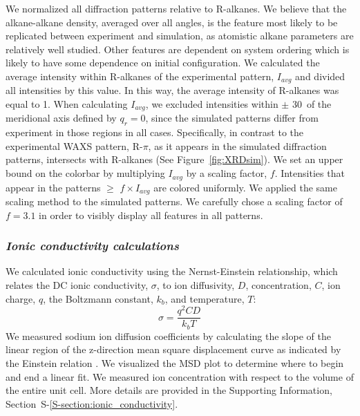 \documentclass[journal=jpcbfk,manuscript=article]{achemso}
\begin{document}
  We normalized all diffraction patterns relative to R-alkanes. We believe that the
  alkane-alkane density, averaged over all angles, is the feature most likely to be
  replicated between experiment and simulation, as atomistic alkane parameters are 
  relatively well studied. Other features are dependent on 
  system ordering which is likely to have some dependence on initial configuration. 
  We calculated the average intensity within R-alkanes of the experimental pattern,
  $I_{avg}$ and divided all intensities by this value. In this way, the average intensity
  of R-alkanes was equal to 1. When calculating $I_{avg}$, we excluded intensities 
  within $\pm$ 30\degree~of the meridional axis defined by $q_r=0$, since the simulated
  patterns differ from experiment in those regions in all cases. Specifically, in contrast
  to the experimental WAXS pattern, R-$\pi$, as it appears in the simulated diffraction 
  patterns, intersects with R-alkanes (See Figure~\ref{fig:XRDsim}). We set
  an upper bound on the colorbar by multiplying $I_{avg}$ by a scaling factor, $f$. 
  Intensities that appear in the patterns $\geq$ $f\times I_{avg}$ are colored uniformly. 
  We applied the same scaling method to the simulated patterns. We carefully chose a scaling
  factor of $f=3.1$ in order to visibly display all features in all patterns.

  \subsubsection{\textit{Ionic conductivity calculations}}

  We calculated ionic conductivity using the Nernst-Einstein relationship, which 
  relates the DC ionic conductivity, $\sigma$, to ion diffusivity, $D$, 
  concentration, $C$, ion charge, $q$, the Boltzmann constant, $k_b$, and 
  temperature, $T$: 
  \begin{equation}
	\sigma = \dfrac{q^2CD}{k_b T} 
	\label{eqn:nernst_einstein}
  \end{equation}
  We measured sodium ion diffusion coefficients by calculating the slope
  of the linear region of the z-direction mean square displacement curve as
  indicated by the Einstein relation \cite{einstein_investigations_1956}. We
  visualized the MSD plot to determine where to begin and end a linear fit. We
  measured ion concentration with respect to the volume of the entire unit cell. 
  More details are provided in the Supporting Information, Section~S-\ref{S-section:ionic_conductivity}.
\end{document}
